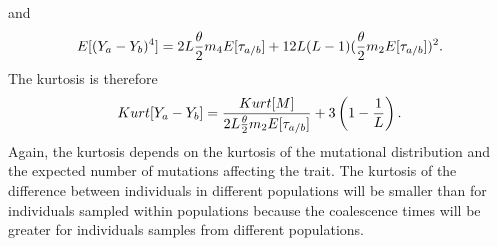 and
\begin{equation}
  E[(Y_a-Y_b)^4]=2L\frac{\theta}{2} m_4 E[\tau_{a/b}] + 12L(L-1)(\frac{\theta}{2} m_2 E[\tau_{a/b}])^2.
\end{equation}
The kurtosis is therefore
\begin{equation}
  \label{eq:diff_kurt}
  Kurt[Y_a-Y_b]=\frac{Kurt[M]}{2 L\frac{\theta}{2} m_2 E[\tau_{a/b}]} + 3\left(1-\frac{1}{L} \right).
\end{equation}
Again, the kurtosis depends on the kurtosis of the mutational distribution and
the expected number of mutations affecting the trait. The kurtosis of the
difference between individuals in different populations will be smaller than for
individuals sampled within populations because the coalescence times will be
greater for individuals samples from different populations.
